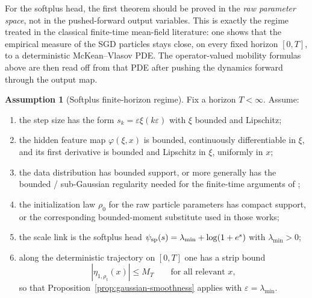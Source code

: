 \documentclass[11pt]{article}
\theoremstyle{definition}
\newtheorem{assumption}[theorem]{Assumption}
\begin{document}
For the softplus head, the first theorem should be proved in the \emph{raw
parameter space}, not in the pushed-forward output variables. This is exactly
the regime treated in the classical finite-time mean-field literature:
one shows that the empirical measure of the SGD particles stays close, on every
fixed horizon $[0,T]$, to a deterministic McKean--Vlasov PDE. The
operator-valued mobility formulas above are then read off from that PDE after
pushing the dynamics forward through the output map.

\begin{assumption}[Softplus finite-horizon regime]
\label{ass:softplus-finite-horizon}
Fix a horizon $T<\infty$. Assume:
\begin{enumerate}[label=(FH\arabic*)]
  \item the step size has the form $s_k=\varepsilon \xi(k\varepsilon)$ with
  $\xi$ bounded and Lipschitz;
  \item the hidden feature map $\varphi(\xi,x)$ is bounded, continuously
  differentiable in $\xi$, and its first derivative is bounded and Lipschitz in
  $\xi$, uniformly in $x$;
  \item the data distribution has bounded support, or more generally has the
  bounded / sub-Gaussian regularity needed for the finite-time arguments of
  \cite{MeiMisiakiewiczMontanari2019,SirignanoSpiliopoulos2020};
  \item the initialization law $\rho_0$ for the raw particle parameters has
  compact support, or the corresponding bounded-moment substitute used in those
  works;
  \item the scale link is the softplus head
  $\psi_{\rm sp}(s)=\lambda_{\min}+\log(1+e^s)$ with $\lambda_{\min}>0$;
  \item along the deterministic trajectory on $[0,T]$ one has a strip bound
  \[
    |\eta_{1,\rho_t}(x)|\le M_T
    \qquad\text{for all relevant }x,
  \]
  so that Proposition~\ref{prop:gaussian-smoothness} applies with
  $\varepsilon=\lambda_{\min}$.
\end{enumerate}
\end{assumption}
\end{document}
